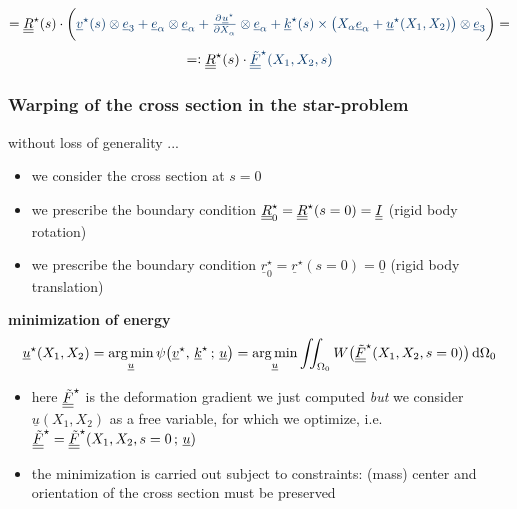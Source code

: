 \begin{frame}
\begin{displaymath}
    = \doubleunderline{R}^{\star}(s) \cdot \biggl( {\color{faublue}
        \underline{v}^{\star}(s) \otimes \underline{e}_3 + 
        \underline{e}_{\alpha} \otimes \underline{e}_{\alpha} + 
        \pd{\underline{u}^{\star}}{X_{\alpha}} \otimes \underline{e}_{\alpha} +
        \underline{k}^{\star}(s) \times \bigl( X_{\alpha} \underline{e}_{\alpha} + \underline{u}^{\star}(X_1,X_2) \bigr) \otimes \underline{e}_3 }
      \biggr) =
  \end{displaymath}
  \begin{displaymath}
    =: \doubleunderline{R}^{\star}(s) \cdot {\color{faublue} \doubleunderline{\tilde{F}}^{\star} (X_1,X_2,s) }
  \end{displaymath}
\end{frame}


\begin{frame}
  \frametitle{Warping of the cross section in the star-problem}
  without loss of generality ...
  \begin{itemize}
    \item we consider the cross section at $s=0$
    \item we prescribe the boundary condition $\underline{\underline{R}}^{\star}_0 = \underline{\underline{R}}^{\star}(s=0) = \underline{\underline{I}}$ \: (rigid body rotation)
    \item we prescribe the boundary condition $\underline{r}^{\star}_0 = \underline{r}^{\star}(s=0) = \underline{0}$ \: (rigid body translation)
  \end{itemize}

  \vspace{1em}
  \textbf{minimization of energy}
  \begin{displaymath}
    \underline{u}^{\star}(X_1,X_2) =
    \argmin_{\underline{u}} \psi \bigl( \underline{v}^{\star}, \, \underline{k}^{\star} \, ; \, \underline{u} \bigr) =
    \argmin_{\underline{u}} \iint_{\Omega_0} W \bigl( \doubleunderline{\tilde{F}}^{\star}(X_1,X_2,s=0) \bigr)  \dif \Omega_0
  \end{displaymath}
  \begin{itemize}
    \item here $\underline{\underline{\tilde{F}}}^{\star}$ is the deformation gradient we just computed \textit{but} we consider $\underline{u}(X_1,X_2)$ as a free variable, for which we optimize, i.e. $\underline{\underline{\tilde{F}}}^{\star} = \underline{\underline{\tilde{F}}}^{\star}(X_1,X_2,s=0 \, ; \, \underline{u})$
    \item the minimization is carried out subject to constraints: \newline
      (mass) center and orientation of the cross section must be preserved 
  \end{itemize}
  
  
\end{frame}



